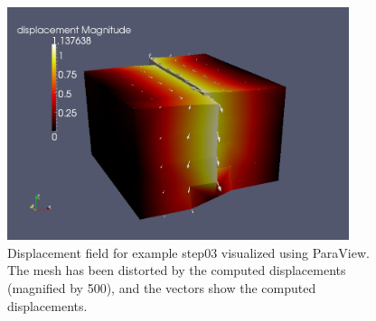 \begin{figure}
  \includegraphics[width=10cm]{examples/figs/3dhex8_step03-displ}
  \caption{Displacement field for example step03 visualized using ParaView. The
    mesh has been distorted by the computed displacements (magnified by
    500), and the vectors show the computed displacements.}
  \label{fig:example:3dhex8:step03-displacement}
\end{figure}


